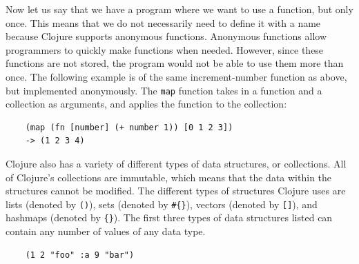 \documentclass[12pt]{article}
\newcommand{\comment}[1]{{\bf \tt  {#1}}}
\newcommand{\emcomment}[1]{\textcolor{ForestGreen}{\comment{Elena: {#1}}}}
\newcommand{\mmcomment}[1]{\textcolor{magenta}{\comment{Max: {#1}}}}
\begin{document}
Now let us say that we have a program where we want to use a function, but only once. This means that
we do not necessarily need to define it with a name because Clojure supports anonymous functions.
Anonymous functions allow programmers to quickly make
functions when needed. 
However, since these functions are not  stored, the program would not be able to use them more than
once. 
The following example is of the same increment-number function as above, but implemented anonymously.
The \texttt{map} function takes in a function and a collection as arguments, and applies the function
to the collection: 
\begin{verbatim}
	(map (fn [number] (+ number 1)) [0 1 2 3])
	-> (1 2 3 4)
\end{verbatim}



Clojure also has a variety of different types of data structures, or collections. All 
of Clojure's collections are immutable, which means that the data within the structures cannot be
modified. 
The different types of structures Clojure uses are lists (denoted by \texttt{()}), sets (denoted by
\texttt{\#\{\}}), vectors (denoted by \texttt{[]}), and hashmaps (denoted by \texttt{\{\}}). The first
three types of data structures listed can contain any number of values of any data type.
\begin{verbatim}
	(1 2 "foo" :a 9 "bar")
\end{verbatim}
\end{document}
